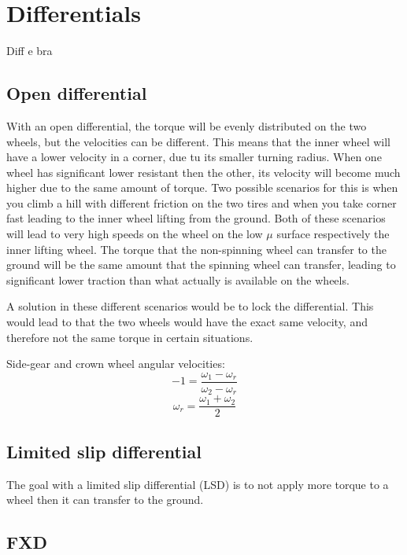 \section{Differentials}

Diff e bra

\subsection{Open differential}

With an open differential, the torque will be evenly distributed on the two wheels, but the velocities can be different. This means that the inner wheel will have a lower velocity in a corner, due tu its smaller turning radius. When one wheel has significant lower resistant then the other, its velocity will become much higher due to the same amount of torque. Two possible scenarios for this is when you climb a hill with different friction on the two tires and when you take corner fast leading to the inner wheel lifting from the ground. Both of these scenarios will lead to very high speeds on the wheel on the low $ \mu $ surface respectively the inner lifting wheel. The torque that the non-spinning wheel can transfer to the ground will be the same amount that the spinning wheel can transfer, leading to significant lower traction than what actually is available on the wheels.

A solution in these different scenarios would be to lock the differential. This would lead to that the two wheels would have the exact same velocity, and therefore not the same torque in certain situations. 

Side-gear and crown wheel angular velocities:
\begin{equation}
	-1 = \frac{\omega_{1} - \omega_{r}}{\omega_{2} - \omega_{r}}
\end{equation}
\begin{equation}
	\omega_{r} = \frac{\omega_{1} + \omega_{2}}{2}
\end{equation}



\subsection{Limited slip differential}

The goal with a limited slip differential (LSD) is to not apply more torque to a wheel then it can transfer to the ground. 

\subsection{FXD}